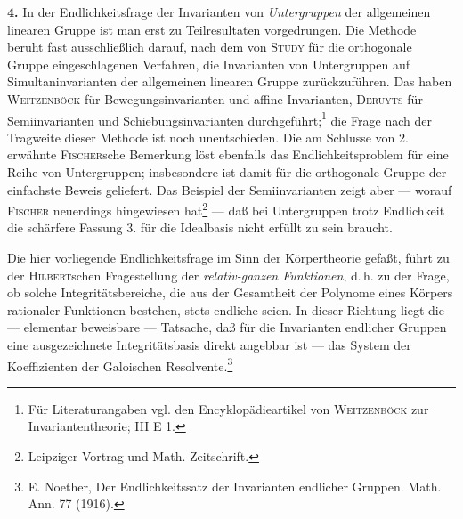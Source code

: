\textbf{4.} In der Endlichkeitsfrage der Invarianten von \emph{Untergruppen} der allgemeinen linearen Gruppe ist man erst zu Teilresultaten vorgedrungen. Die Methode beruht fast ausschließlich darauf, nach dem von \textsc{Study} für die orthogonale Gruppe eingeschlagenen Verfahren, die Invarianten von Untergruppen auf Simultaninvarianten der allgemeinen linearen Gruppe zurückzuführen. Das haben \textsc{Weitzenböck} für Bewegungsinvarianten und affine Invarianten, \textsc{Deruyts} für Semiinvarianten und Schiebungsinvarianten durchgeführt;\footnote{Für Literaturangaben vgl. den Encyklopädieartikel von \textsc{Weitzenböck} zur Invariantentheorie; III E 1.} die Frage nach der Tragweite dieser Methode ist noch unentschieden. Die am Schlusse von 2. erwähnte \textsc{Fischer}sche Bemerkung löst ebenfalls das Endlichkeitsproblem für eine Reihe von Untergruppen; insbesondere ist damit für die orthogonale Gruppe der einfachste Beweis geliefert. Das Beispiel der Semiinvarianten zeigt aber --- worauf \textsc{Fischer} neuerdings hingewiesen hat\footnote{Leipziger Vortrag und Math. Zeitschrift.} --- daß bei Untergruppen trotz Endlichkeit die schärfere Fassung 3. für die Idealbasis nicht erfüllt zu sein braucht.

Die hier vorliegende Endlichkeitsfrage im Sinn der Körpertheorie gefaßt, führt zu der \textsc{Hilbert}schen Fragestellung der \emph{relativ-ganzen Funktionen}, d.\,h. zu der Frage, ob solche Integritätsbereiche, die aus der Gesamtheit der Polynome eines Körpers rationaler Funktionen bestehen, stets endliche seien. In dieser Richtung liegt die --- elementar beweisbare --- Tatsache, daß für die Invarianten endlicher Gruppen eine ausgezeichnete Integritätsbasis direkt angebbar ist --- das System der Koeffizienten der Galoischen Resolvente.\footnote{E. Noether, Der Endlichkeitssatz der Invarianten endlicher Gruppen. Math. Ann. 77 (1916).}

